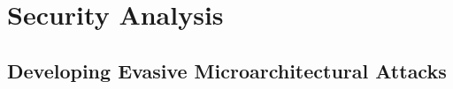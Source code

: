 \section{Security Analysis}\label{sec:whac}\label{sec:varSpec}

\subsection{Developing Evasive Microarchitectural Attacks }